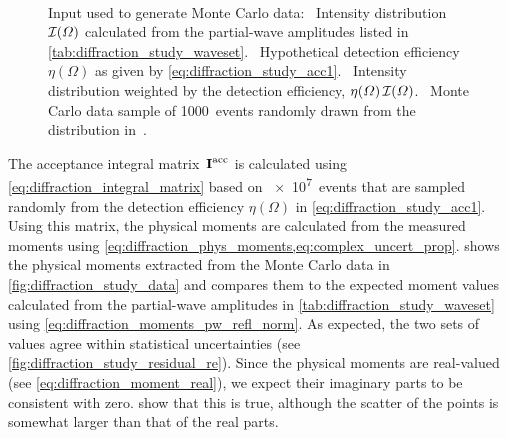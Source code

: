 \begin{figure}[tbp]
  \centering%
  \\%
  \caption{Input used to generate Monte Carlo data:
  ~Intensity
  distribution $\mathcal{I}(\Omega)$ calculated from the partial-wave
  amplitudes listed in \cref{tab:diffraction_study_waveset}.
  ~Hypothetical
  detection efficiency $\eta(\Omega)$ as given by
  \cref{eq:diffraction_study_acc1}.
  ~Intensity
  distribution weighted by the detection efficiency, \ie
  $\eta(\Omega)\, \mathcal{I}(\Omega)$.
  ~Monte Carlo data sample
  of \num{1000}~events randomly drawn from the distribution
  in~.}%
  \label{fig:diffraction_study_input}%
\end{figure}

The acceptance integral matrix~$\bm{\mathrm{I}}^\text{acc}$ is calculated
using \cref{eq:diffraction_integral_matrix} based on \num{e7}~events
that are sampled randomly from the detection efficiency $\eta(\Omega)$
in \cref{eq:diffraction_study_acc1}.  Using this matrix, the physical
moments are calculated from the measured moments using
\cref{eq:diffraction_phys_moments,eq:complex_uncert_prop}.
 shows the physical moments
extracted from the Monte Carlo data in
\cref{fig:diffraction_study_data} and compares them to the expected
moment values calculated from the partial-wave amplitudes in
\cref{tab:diffraction_study_waveset} using
\cref{eq:diffraction_moments_pw_refl_norm}.  As expected, the two sets
of values  agree within statistical uncertainties (see
\cref{fig:diffraction_study_residual_re}).  Since the physical moments
are real-valued (see \cref{eq:diffraction_moment_real}), we expect
their imaginary parts to be consistent with zero.
show that this is true, although the scatter of the points is somewhat
larger than that of the real parts.

